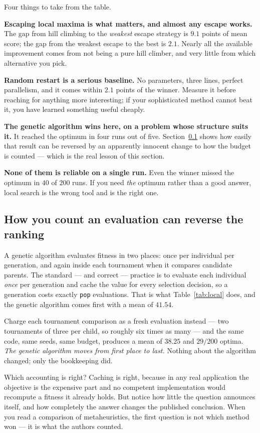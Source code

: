Four things to take from the table.

\textbf{Escaping local maxima is what matters, and almost any escape works.} The gap
from hill climbing to the \emph{weakest} escape strategy is $9.1$ points of mean
score; the gap from the weakest escape to the best is $2.1$. Nearly all the available
improvement comes from not being a pure hill climber, and very little from which
alternative you pick.

\textbf{Random restart is a serious baseline.} No parameters, three lines, perfect
parallelism, and it comes within $2.1$ points of the winner. Measure it before
reaching for anything more interesting; if your sophisticated method cannot beat it,
you have learned something useful cheaply.

\textbf{The genetic algorithm wins here, on a problem whose structure suits it.} It
reached the optimum in four runs out of five. Section~\ref{sec:accounting} shows how
easily that result can be reversed by an apparently innocent change to how the
budget is counted --- which is the real lesson of this section.

\textbf{None of them is reliable on a single run.} Even the winner missed the optimum
in $40$ of $200$ runs. If you need \emph{the} optimum rather than a good answer,
local search is the wrong tool and  is the right one.

\subsection{How you count an evaluation can reverse the ranking}
\label{sec:accounting}

\begin{alertbox}
A genetic algorithm evaluates fitness in two places: once per individual per
generation, and again inside each tournament when it compares candidate parents. The
standard --- and correct --- practice is to evaluate each individual \emph{once} per
generation and cache the value for every selection decision, so a generation costs
exactly \texttt{pop} evaluations. That is what Table~\ref{tab:local} does, and the
genetic algorithm comes first with a mean of $41.54$.

Charge each tournament comparison as a fresh evaluation instead --- two tournaments
of three per child, so roughly six times as many --- and the same code, same seeds,
same budget, produces a mean of $38.25$ and $29/200$ optima. \emph{The genetic
algorithm moves from first place to last.} Nothing about the algorithm changed; only
the bookkeeping did.

\smallskip
Which accounting is right? Caching is right, because in any real application the
objective is the expensive part and no competent implementation would recompute a
fitness it already holds. But notice how little the question announces itself, and
how completely the answer changes the published conclusion. When you read a
comparison of metaheuristics, the first question is not which method won --- it is
what the authors counted.
\end{alertbox}


